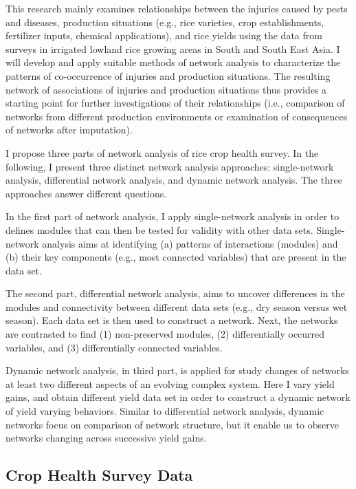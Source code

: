 

This research mainly examines relationships between the injuries caused by pests and diseases, production situations (e.g., rice varieties, crop establishments, fertilizer inputs, chemical applications), and rice yields using the data from surveys in irrigated lowland rice growing areas in South and South East Asia. I will develop and apply suitable methods of network analysis to characterize the patterns of co-occurrence of injuries and production situations. The resulting network of associations of injuries and production situations thus provides a starting point for further investigations of their relationships (i.e., comparison of networks from different production environments or examination of consequences of networks after imputation).

I propose three parts of network analysis of rice crop health survey. In the following, I present three distinct network analysis approaches: single-network analysis, differential network analysis, and dynamic network analysis. The three approaches answer different questions. 

In the first part of network analysis, I apply single-network analysis in order to defines modules that can then be tested for validity with other data sets. Single-network analysis aims at identifying (a) patterns of interactions (modules) and (b) their key components (e.g., most connected variables) that are present in the data set.

The second part, differential network analysis, aims to uncover differences in the modules and connectivity between different data sets (e.g., dry season versus wet season). Each data set is then used to construct a network. Next, the networks are contrasted to find (1) non-preserved modules, (2) differentially occurred variables, and (3) differentially connected variables. 

Dynamic network analysis, in third part, is applied for study changes of networks at least two different aspects of an evolving complex system. Here I vary yield gains, and obtain different yield data set in order to construct a dynamic network of yield varying behaviors.  Similar to differential network analysis, dynamic networks focus on comparison of network structure, but it enable us to observe networks changing across successive yield gains. 


\subsection*{Crop Health Survey Data}


